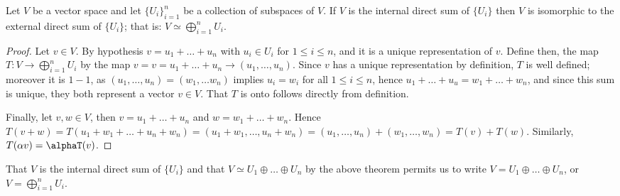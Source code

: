 \begin{theorem}
    Let $V$ be a vector space and let  $\{U_i\}_{i=1}^n$ be a collection of
    subspaces of $V$. If $V$ is the internal direct sum of  $\{U_i\}$ then $V$
    is isomorphic to the external direct sum of  $\{U_i\}$; that is: $V
    \simeq \bigoplus_{i=1}^n{U_i}$.
\end{theorem}
\begin{proof}
    Let $v \in V$. By hypothesis $v=u_1+\dots+u_n$ with $u_i \in U_i$ for  $1
    \leq i \leq n$, and it is a unique representation of  $v$. Define then, the
    map  $T:V \rightarrow \bigoplus_{i=1}^n{U_i}$ by the map $v=v=u_1+\dots+u_n
    \rightarrow (u_1, \dots, u_n)$. Since $v$ has a unique representation by
    definition,  $T$ is well defined; moreover it is $1-1$, as $(u_1, \dots,
    u_n)=(w_1, \dots w_n)$ implies $u_i=w_i$ for all  $1 \leq i \leq n$, hence
    $ u_1+\dots+u_u=w_1+\dots+w_n$, and since this sum is unique, they both
    represent a vector $v \in V$. That  $T$ is onto follows directly from
    definition.

    Finally, let  $v,w \in V$, then  $v=u_1+\dots+u_n$ and $w=w_1+\dots+w_n$.
    Hence $T(v+w)=T(u_1+w_1+\dots+u_n+w_n)=(u_1+w_1, \dots, u_n+w_n)=(u_1,
    \dots, u_n)+(w_1, \dots, w_n)=T(v)+T(w)$. Similarly, $T(\alpha
    v)=\alphaT(v)$.
\end{proof}
\begin{remark} 
    That $V$ is the internal direct sum of  $\{U_i\}$ and that $V \simeq U_1 \oplus
    \dots \oplus U_n$ by the above theorem permits us to write $V=U_1 \oplus
    \dots \oplus U_n$, or $V=\bigoplus_{i=1}^n{U_i}$.
\end{remark}
